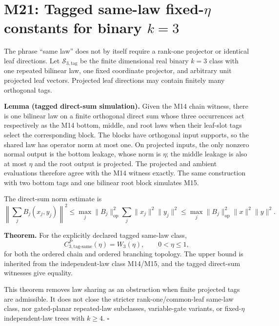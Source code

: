 \section*{M21: Tagged same-law fixed-$\eta$ constants for binary $k=3$}
\label{sec:m21-tagged-same-law}

The phrase ``same law'' does not by itself require a rank-one projector or
identical leaf directions.  Let $\mathcal S_{3,\mathrm{tag}}$ be the finite
dimensional real binary $k=3$ class with one repeated bilinear law, one fixed
coordinate projector, and arbitrary unit projected leaf vectors.  Projected
leaf directions may contain finitely many orthogonal tags.

\textbf{Lemma (tagged direct-sum simulation).}  Given the M14 chain witness,
there is one bilinear law on a finite orthogonal direct sum whose three
occurrences act respectively as the M14 bottom, middle, and root laws when
their leaf-slot tags select the corresponding block.  The blocks have
orthogonal input supports, so the shared law has operator norm at most one.
On projected inputs, the only nonzero normal output is the bottom leakage,
whose norm is $\eta$; the middle leakage is also at most $\eta$ and the root
output is projected.  The projected and ambient evaluations therefore agree
with the M14 witness exactly.  The same construction with two bottom tags and
one bilinear root block simulates M15.

The direct-sum norm estimate is
\[
 \left\|\sum_j B_j(x_j,y_j)\right\|^2
 \le \max_j\|B_j\|_{\mathrm{op}}^2
       \sum_j\|x_j\|^2\|y_j\|^2
 \le \max_j\|B_j\|_{\mathrm{op}}^2\|x\|^2\|y\|^2.
\]

\textbf{Theorem.} For the explicitly declared tagged same-law class,
\[
 \boxed{
 C_{3,\mathrm{tag\text{-}same}}^P(\eta)=W_3(\eta),
 \qquad 0<\eta\le1,
 }
\]
for both the ordered chain and ordered branching topology. The upper bound
is inherited from the independent-law class M14/M15, and the tagged
direct-sum witnesses give equality.

This theorem removes law sharing as an obstruction when finite projected tags
are admissible. It does not close the stricter rank-one/common-leaf same-law
class, nor gated-planar repeated-law subclasses, variable-gate variants, or
fixed-$\eta$ independent-law trees with $k\ge4$.
\hfill$\square$

